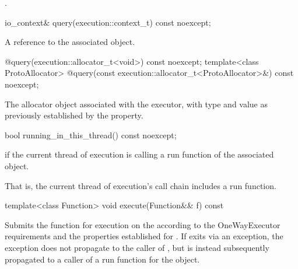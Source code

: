 \begin{itemdescr}
\pnum
\returns {}.
\end{itemdescr}

\begin{itemdecl}
io_context& query(execution::context_t) const noexcept;
\end{itemdecl}

\begin{itemdescr}
\pnum
\returns A reference to the associated  object.
\end{itemdescr}

\begin{itemdecl}
@\seebelow@ query(execution::allocator_t<void>) const noexcept;
template<class ProtoAllocator>
  @\seebelow@ query(const execution::allocator_t<ProtoAllocator>&) const noexcept;
\end{itemdecl}

\begin{itemdescr}
\pnum
\returns The allocator object associated with the executor, with type and value as previously established by the  property.
\end{itemdescr}

%
\begin{itemdecl}
bool running_in_this_thread() const noexcept;
\end{itemdecl}

\begin{itemdescr}
\pnum
\returns {} if the current thread of execution is calling a run function of the associated  object. \begin{note} That is, the current thread of execution's call chain includes a run function. \end{note}
\end{itemdescr}

%
\begin{itemdecl}
template<class Function>
  void execute(Function&& f) const
\end{itemdecl}

\begin{itemdescr}
\pnum
\effects Submits the function  for execution on the  according to the OneWayExecutor requirements and the properties established for . If  exits via an exception, the exception does not propagate to the caller of , but is instead subsequently propagated to a caller of a run function for the  object.
\end{itemdescr}



